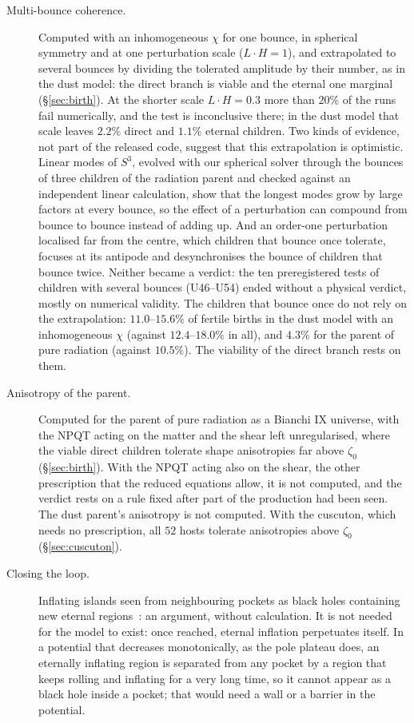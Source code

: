 \documentclass[11pt,a4paper]{article}
\begin{document}
\begin{description}
\item[Multi-bounce coherence.] Computed with an inhomogeneous $\chi$ for one bounce, in spherical symmetry and at one perturbation scale ($L\cdot H=1$), and extrapolated to several bounces by dividing the tolerated amplitude by their number, as in the dust model: the direct branch is viable and the eternal one marginal (\S\ref{sec:birth}). At the shorter scale $L\cdot H=0.3$ more than $20\%$ of the runs fail numerically, and the test is inconclusive there; in the dust model that scale leaves $2.2\%$ direct and $1.1\%$ eternal children. Two kinds of evidence, not part of the released code, suggest that this extrapolation is optimistic. Linear modes of $S^3$, evolved with our spherical solver through the bounces of three children of the radiation parent and checked against an independent linear calculation, show that the longest modes grow by large factors at every bounce, so the effect of a perturbation can compound from bounce to bounce instead of adding up. And an order-one perturbation localised far from the centre, which children that bounce once tolerate, focuses at its antipode and desynchronises the bounce of children that bounce twice. Neither became a verdict: the ten preregistered tests of children with several bounces (U46--U54) ended without a physical verdict, mostly on numerical validity. The children that bounce once do not rely on the extrapolation: $11.0$--$15.6\%$ of fertile births in the dust model with an inhomogeneous $\chi$ (against $12.4$--$18.0\%$ in all), and $4.3\%$ for the parent of pure radiation (against $10.5\%$). The viability of the direct branch rests on them.
\item[Anisotropy of the parent.] Computed for the parent of pure radiation as a Bianchi IX universe, with the NPQT acting on the matter and the shear left unregularised, where the viable direct children tolerate shape anisotropies far above $\zeta_0$ (\S\ref{sec:birth}). With the NPQT acting also on the shear, the other prescription that the reduced equations allow, it is not computed, and the verdict rests on a rule fixed after part of the production had been seen. The dust parent's anisotropy is not computed. With the cuscuton, which needs no prescription, all $52$ hosts tolerate anisotropies above $\zeta_0$ (\S\ref{sec:cuscuton}).
\item[Closing the loop.] Inflating islands seen from neighbouring pockets as black holes containing new eternal regions~\cite{GVZ2016}: an argument, without calculation. It is not needed for the model to exist: once reached, eternal inflation perpetuates itself. In a potential that decreases monotonically, as the pole plateau does, an eternally inflating region is separated from any pocket by a region that keeps rolling and inflating for a very long time, so it cannot appear as a black hole inside a pocket; that would need a wall or a barrier in the potential.

\end{description}
\end{document}
